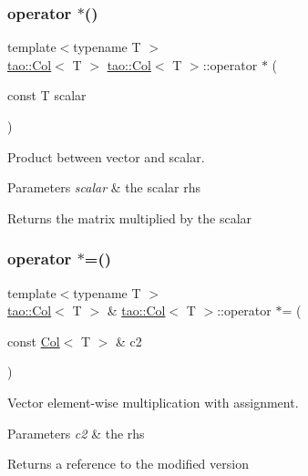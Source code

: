 \subsubsection{\texorpdfstring{operator $\ast$()}{operator *()}\hspace{0.1cm}{\footnotesize\ttfamily [2/2]}}
{\footnotesize\ttfamily template$<$typename T $>$ \\
\mbox{\hyperlink{classtao_1_1_col}{tao\+::\+Col}}$<$ T $>$ \mbox{\hyperlink{classtao_1_1_col}{tao\+::\+Col}}$<$ T $>$\+::operator $\ast$ (\begin{DoxyParamCaption}\item[{const T}]{scalar }\end{DoxyParamCaption})}



Product between vector and scalar. 


\begin{DoxyParams}{Parameters}
{\em scalar} & the scalar rhs \\
\hline
\end{DoxyParams}
\begin{DoxyReturn}{Returns}
the matrix multiplied by the scalar 
\end{DoxyReturn}
\mbox{\label{classtao_1_1_col_a9274e5a0efd840c97741d05dca7bd5a2}} 
\subsubsection{\texorpdfstring{operator $\ast$=()}{operator *=()}\hspace{0.1cm}{\footnotesize\ttfamily [1/2]}}
{\footnotesize\ttfamily template$<$typename T $>$ \\
\mbox{\hyperlink{classtao_1_1_col}{tao\+::\+Col}}$<$ T $>$ \& \mbox{\hyperlink{classtao_1_1_col}{tao\+::\+Col}}$<$ T $>$\+::operator $\ast$= (\begin{DoxyParamCaption}\item[{const \mbox{\hyperlink{classtao_1_1_col}{Col}}$<$ T $>$ \&}]{c2 }\end{DoxyParamCaption})}



Vector element-\/wise multiplication with assignment. 


\begin{DoxyParams}{Parameters}
{\em c2} & the rhs \\
\hline
\end{DoxyParams}
\begin{DoxyReturn}{Returns}
a reference to the modified version 
\end{DoxyReturn}
\mbox{\label{classtao_1_1_col_a29c998087d6d7b98ecee1ba9fb7237a9}} 

